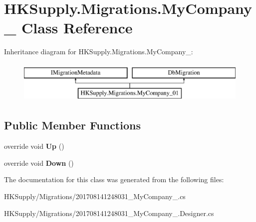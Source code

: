\hypertarget{class_h_k_supply_1_1_migrations_1_1_my_company__01}{}\section{H\+K\+Supply.\+Migrations.\+My\+Company\+\_ Class Reference}
\label{class_h_k_supply_1_1_migrations_1_1_my_company__01}
Inheritance diagram for H\+K\+Supply.\+Migrations.\+My\+Company\+\_\+:\begin{figure}[H]
\begin{center}
\leavevmode
\includegraphics[height=2.000000cm]{class_h_k_supply_1_1_migrations_1_1_my_company__01}
\end{center}
\end{figure}
\subsection*{Public Member Functions}
\begin{DoxyCompactItemize}
\item 
\mbox{\label{class_h_k_supply_1_1_migrations_1_1_my_company__01_a7eedcb949375f9a4b3e0bb99f32b845d}} 
override void {\bfseries Up} ()
\item 
\mbox{\label{class_h_k_supply_1_1_migrations_1_1_my_company__01_a4e3c7cfbb415efd3d39636507b5f0994}} 
override void {\bfseries Down} ()
\end{DoxyCompactItemize}


The documentation for this class was generated from the following files\+:\begin{DoxyCompactItemize}
\item 
H\+K\+Supply/\+Migrations/201708141248031\+\_\+\+My\+Company\+\_.\+cs\item 
H\+K\+Supply/\+Migrations/201708141248031\+\_\+\+My\+Company\+\_.\+Designer.\+cs\end{DoxyCompactItemize}
